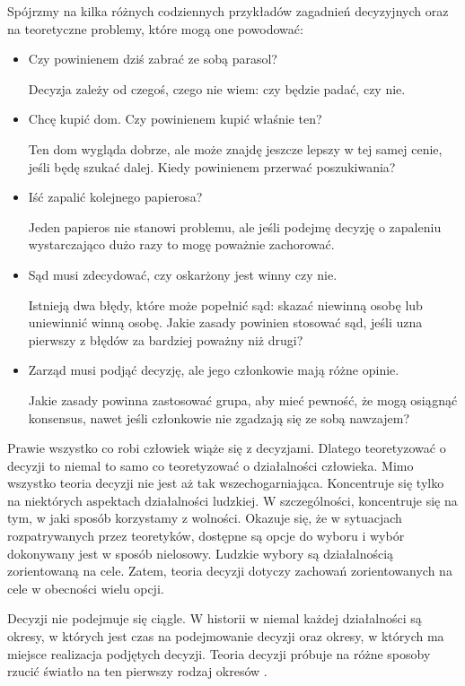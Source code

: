 Spójrzmy na kilka różnych codziennych przykładów zagadnień decyzyjnych oraz na 
teoretyczne problemy, które mogą one powodować:
\begin{itemize}

\item Czy powinienem dziś zabrać ze sobą parasol?

Decyzja zależy od czegoś, czego nie wiem: czy będzie padać, czy nie.

\item  Chcę kupić dom. Czy powinienem kupić właśnie ten?

Ten dom wygląda dobrze, ale może znajdę jeszcze lepszy w tej samej cenie, jeśli 
będę szukać dalej. Kiedy powinienem przerwać poszukiwania?

\item Iść zapalić kolejnego papierosa?

Jeden papieros nie stanowi problemu, ale jeśli podejmę decyzję o zapaleniu
wystarczająco dużo razy to mogę poważnie zachorować.

\item Sąd musi zdecydować, czy oskarżony jest winny czy nie.

Istnieją dwa błędy, które może popełnić sąd: skazać niewinną osobę lub
uniewinnić winną osobę. Jakie zasady powinien stosować sąd, jeśli uzna pierwszy
z błędów za bardziej poważny niż drugi?

\item Zarząd musi podjąć decyzję, ale jego członkowie mają różne opinie.

Jakie zasady powinna zastosować grupa, aby mieć pewność, że mogą osiągnąć
konsensus, nawet jeśli członkowie nie zgadzają się ze sobą nawzajem?

\end{itemize}

Prawie wszystko co robi człowiek wiąże się z decyzjami. Dlatego teoretyzować o 
decyzji to niemal to samo co teoretyzować o działalności człowieka. Mimo 
wszystko teoria decyzji nie jest aż tak wszechogarniająca. Koncentruje się 
tylko na niektórych aspektach działalności ludzkiej. W szczególności, 
koncentruje się na tym, w jaki sposób korzystamy z wolności. Okazuje się, że w 
sytuacjach rozpatrywanych przez teoretyków, dostępne są opcje do wyboru i wybór 
dokonywany jest w sposób nielosowy. Ludzkie wybory są działalnością 
zorientowaną na cele. Zatem, teoria decyzji dotyczy zachowań zorientowanych na 
cele w obecności wielu opcji.

Decyzji nie podejmuje się ciągle. W historii w niemal każdej 
działalności są okresy, w których jest czas na podejmowanie decyzji oraz 
okresy, w których ma miejsce realizacja podjętych decyzji. Teoria decyzji 
próbuje na różne sposoby rzucić światło na ten pierwszy rodzaj okresów
\cite{Harrison1999}.

